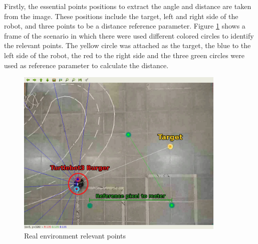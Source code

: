 Firstly, the essential points positions to extract the angle and distance are taken from the image.
These positions include the target, left and right side of the robot, and three points to be a distance reference parameter.
{\color{blue}Figure} \ref{fig:pixel_to_meter} shows a frame of the scenario in which there were used different colored circles to identify the relevant points.
The yellow circle was attached as the target, the blue to the left side of the robot, the red to the right side and the three green circles were used as reference parameter to calculate the distance.

\begin{figure}[H]
\centerline{\includegraphics[width=10cm]{images/pixel_to_meter.png}}
\caption{Real environment relevant points}
\label{fig:pixel_to_meter}
\end{figure}


